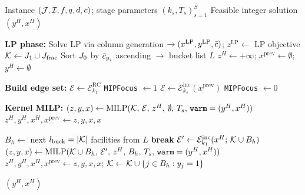\begin{algorithm}[t]
\caption{Funnel Kernel Search (FKS)}
\label{alg:fks}
\begin{algorithmic}[1]
\Require Instance $(\mathcal{J},\mathcal{I},f,q,d,c)$; stage parameters $(k_s, T_s)_{s=1}^{S}$
\Ensure Feasible integer solution $(y^H, x^H)$

\State \textbf{LP phase:} Solve LP via column generation
       $\to (x^{\text{LP}}, y^{\text{LP}}, \bar{c})$; \quad $z^{\text{LP}} \gets$ LP objective
\State $\mathcal{K} \gets J_1 \cup J_{\text{frac}}$
\State Sort $J_0$ by $\bar{c}_{y_j}$ ascending $\to$ bucket list $L$
\State $z^H \gets +\infty$; \quad $x^{\text{prev}} \gets \emptyset$;
       \quad $y^H \gets \emptyset$


  \State \textbf{Build edge set:}
    \State $\mathcal{E} \gets \mathcal{E}^{\text{RC}}_{k_1}$
           \hfill{}
    \State \texttt{MIPFocus} $\gets 1$
           \hfill{}
  \Else
    \State $\mathcal{E} \gets \mathcal{E}^{\text{inc}}_{k_s}(x^{\text{prev}})$
           \hfill{}
    \State \texttt{MIPFocus} $\gets 0$
           \hfill{}
  \EndIf

  \State \textbf{Kernel MILP:}
         $(z, y, x) \gets
         \text{MILP}(\mathcal{K},\, \mathcal{E},\, z^H,\, \emptyset,\, T_s,\,
         \texttt{warm}=(y^H,x^H))$
   \; $z^H, y^H, x^H, x^{\text{prev}} \gets z, y, x, x$
  \EndIf

   \hfill{}
      \State $B_h \gets$ next $l_{\text{buck}} = |\mathcal{K}|$ facilities from $L$
       \textbf{break} \EndIf
      \State $\mathcal{E}' \gets
             \mathcal{E}^{\text{inc}}_{k_1}(x^H;\,\mathcal{K} \cup B_h)$
             \hfill{}
      \State $(z, y, x) \gets
             \text{MILP}(\mathcal{K} \cup B_h,\, \mathcal{E}',\, z^H,\, B_h,\, T_s,\,
             \texttt{warm}=(y^H,x^H))$
       \;
        $z^H, y^H, x^H, x^{\text{prev}} \gets z, y, x, x$;
        $\mathcal{K} \gets \mathcal{K} \cup \{j \in B_h : y_j = 1\}$
      \EndIf
    \EndFor
  \EndIf

\EndFor
\State \Return $(y^H, x^H)$
\end{algorithmic}
\end{algorithm}

